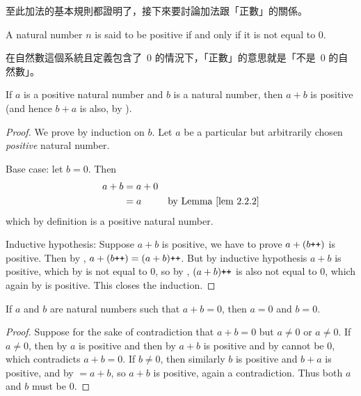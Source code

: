\begin{note}
至此加法的基本規則都證明了，接下來要討論加法跟「正數」的關係。
\end{note}

\begin{definition} \label{def 2.2.7} A natural number \(n\) is said to be positive if and only if it is not equal to \(0\).
\end{definition}
\begin{note}
在自然數這個系統且定義包含了\ \(0\) 的情況下，「正數」的意思就是「不是\ \(0\) 的自然數」。
\end{note}

\begin{proposition}\label{prop 2.2.8} If \(a\) is a positive natural number and \(b\) is a natural number, then \(a + b\) is positive (and hence \(b + a\) is also, by ).
\end{proposition}

\begin{proof}
We prove by induction on \(b\). Let \(a\) be a particular but arbitrarily chosen \emph{positive} natural number.

Base case: let \(b = 0\). Then
\begin{align*}
a + b & = a + 0 & \\
      & = a & \text{by \LEM{2.2.2}} \\
\end{align*}
which by definition is a positive natural number.

Inductive hypothesis: Suppose \(a + b\) is positive, we have to prove \(a + (b\texttt{++})\) is positive.
Then by , \(a + (b\texttt{++}) = (a + b)\texttt{++}\). But by inductive hypothesis \(a + b\) is positive, which by  is not equal to \(0\), so by , \((a + b)\texttt{++}\) is also not equal to \(0\), which again by  is positive. This closes the induction.
\end{proof}

\begin{corollary} \label{corollary 2.2.9}
If \(a\) and \(b\) are natural numbers such that \(a + b = 0\), then \(a = 0\) and \(b = 0\).
\end{corollary}

\begin{proof}
Suppose for the sake of contradiction that \(a + b = 0\) but \(a \neq 0\) or \(a \neq 0\). If \(a \neq 0\), then by  \(a\) is positive and then by  \(a + b\) is positive and by  cannot be \(0\), which contradicts \(a + b = 0\). If \(b \neq 0\), then similarly \(b\) is positive and \(b + a\) is positive, and by  \(= a + b\), so \(a + b\) is positive, again a contradiction. Thus both \(a\) and \(b\) must be \(0\).
\end{proof}

